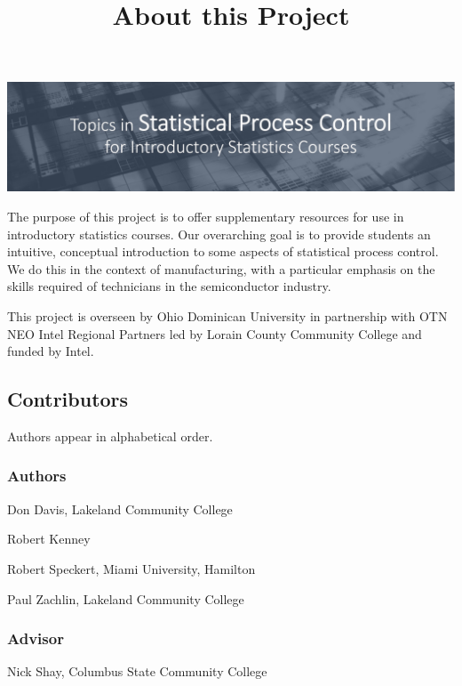 \documentclass{ximera}
\title{About this Project} \license{CC BY-NC-SA 4.0}
\begin{document}
\begin{abstract}
\end{abstract}
\maketitle

\begin{image}
\includegraphics{titleSlideQC.jpg}
\end{image}

The purpose of this project is to offer supplementary resources for use in introductory statistics courses.  Our overarching goal is to provide students an intuitive, conceptual introduction to some 
aspects of statistical process control.  We do this in the context of manufacturing, with a particular emphasis on the skills required of technicians in the semiconductor industry.

This project is overseen by Ohio Dominican University in partnership with OTN NEO Intel Regional Partners led by Lorain County Community College and funded by Intel.


\subsection*{Contributors}
Authors appear in alphabetical order.

\subsubsection*{Authors}

Don Davis, Lakeland Community College

Robert Kenney

Robert Speckert, Miami University, Hamilton

Paul Zachlin, Lakeland Community College

\subsubsection*{Advisor}
Nick Shay, Columbus State Community College
\end{document}
